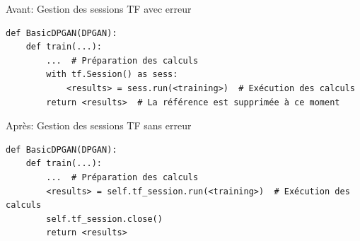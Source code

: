 \documentclass[a4paper,11pt,twoside]{article}
\theoremstyle{definition}
\begin{document}
\begin{listing}
\caption{Avant: Gestion des sessions TF avec erreur}
\label{tfsess_before}
\begin{verbatim}
def BasicDPGAN(DPGAN):
    def train(...):
        ...  # Préparation des calculs
        with tf.Session() as sess:
            <results> = sess.run(<training>)  # Exécution des calculs
        return <results>  # La référence est supprimée à ce moment
\end{verbatim}
\end{listing}

\begin{listing}
\caption{Après: Gestion des sessions TF sans erreur}
\label{tfsess_after}
\begin{verbatim}
def BasicDPGAN(DPGAN):
    def train(...):
        ...  # Préparation des calculs
        <results> = self.tf_session.run(<training>)  # Exécution des calculs
        self.tf_session.close()
        return <results>
\end{verbatim}
\end{listing}


\printbibliography[title=Références,heading=bibintoc]
\end{document}
